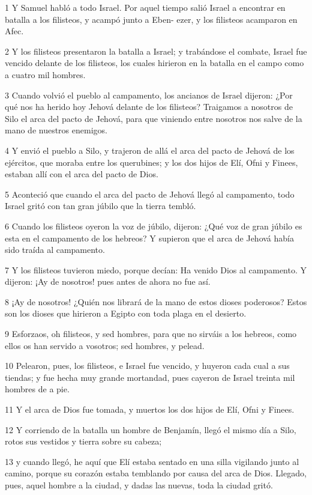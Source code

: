 \par 1 Y Samuel habló a todo Israel. Por aquel tiempo salió Israel a encontrar en batalla a los filisteos, y acampó junto a Eben- ezer, y los filisteos acamparon en Afec.
\par 2 Y los filisteos presentaron la batalla a Israel; y trabándose el combate, Israel fue vencido delante de los filisteos, los cuales hirieron en la batalla en el campo como a cuatro mil hombres.
\par 3 Cuando volvió el pueblo al campamento, los ancianos de Israel dijeron: ¿Por qué nos ha herido hoy Jehová delante de los filisteos? Traigamos a nosotros de Silo el arca del pacto de Jehová, para que viniendo entre nosotros nos salve de la mano de nuestros enemigos.
\par 4 Y envió el pueblo a Silo, y trajeron de allá el arca del pacto de Jehová de los ejércitos, que moraba entre los querubines; y los dos hijos de Elí, Ofni y Finees, estaban allí con el arca del pacto de Dios. 
\par 5 Aconteció que cuando el arca del pacto de Jehová llegó al campamento, todo Israel gritó con tan gran júbilo que la tierra tembló.
\par 6 Cuando los filisteos oyeron la voz de júbilo, dijeron: ¿Qué voz de gran júbilo es esta en el campamento de los hebreos? Y supieron que el arca de Jehová había sido traída al campamento.
\par 7 Y los filisteos tuvieron miedo, porque decían: Ha venido Dios al campamento. Y dijeron: ¡Ay de nosotros! pues antes de ahora no fue así.
\par 8 ¡Ay de nosotros! ¿Quién nos librará de la mano de estos dioses poderosos? Estos son los dioses que hirieron a Egipto con toda plaga en el desierto.
\par 9 Esforzaos, oh filisteos, y sed hombres, para que no sirváis a los hebreos, como ellos os han servido a vosotros; sed hombres, y pelead.
\par 10 Pelearon, pues, los filisteos, e Israel fue vencido, y huyeron cada cual a sus tiendas; y fue hecha muy grande mortandad, pues cayeron de Israel treinta mil hombres de a pie.
\par 11 Y el arca de Dios fue tomada, y muertos los dos hijos de Elí, Ofni y Finees.
\par 12 Y corriendo de la batalla un hombre de Benjamín, llegó el mismo día a Silo, rotos sus vestidos y tierra sobre su cabeza;
\par 13 y cuando llegó, he aquí que Elí estaba sentado en una silla vigilando junto al camino, porque su corazón estaba temblando por causa del arca de Dios. Llegado, pues, aquel hombre a la ciudad, y dadas las nuevas, toda la ciudad gritó.
